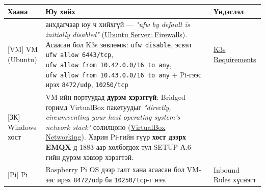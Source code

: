 \begingroup\scriptsize\begin{longtable}[]{@{}lll@{}}
\toprule
\begin{minipage}[b]{0.30\columnwidth}\raggedright
Хаана\strut
\end{minipage} & \begin{minipage}[b]{0.30\columnwidth}\raggedright
Юу хийх\strut
\end{minipage} & \begin{minipage}[b]{0.30\columnwidth}\raggedright
Үндэслэл\strut
\end{minipage}\tabularnewline
\midrule
\endhead
\begin{minipage}[t]{0.30\columnwidth}\raggedright
{[}VM{]} VM (Ubuntu)\strut
\end{minipage} & \begin{minipage}[t]{0.30\columnwidth}\raggedright
анхдагчаар юу ч хийхгүй --- \emph{"ufw by default is initially disabled"} (\href{https://ubuntu.com/server/docs/how-to/security/firewalls/}{Ubuntu Server: Firewalls}). Асаасан бол K3s зөвлөмж: \texttt{ufw\ disable}, эсвэл \texttt{ufw\ allow\ 6443/\allowbreak{}tcp}, \texttt{ufw\ allow\ from\ 10.\allowbreak{}42.\allowbreak{}0.\allowbreak{}0/\allowbreak{}16\ to\ any}, \texttt{ufw\ allow\ from\ 10.\allowbreak{}43.\allowbreak{}0.\allowbreak{}0/\allowbreak{}16\ to\ any} + Pi-гээс ирэх \texttt{8472/udp}, \texttt{10250/tcp}\strut
\end{minipage} & \begin{minipage}[t]{0.30\columnwidth}\raggedright
\href{https://docs.k3s.io/installation/requirements}{K3s Requirements}\strut
\end{minipage}\tabularnewline
\begin{minipage}[t]{0.30\columnwidth}\raggedright
{[}ЗК{]} Windows хост\strut
\end{minipage} & \begin{minipage}[t]{0.30\columnwidth}\raggedright
VM-ийн портуудад \textbf{дүрэм хэрэггүй}: Bridged горимд VirtualBox пакетуудыг \emph{"directly, circumventing your host operating system's network stack"} солилцоно (\href{https://www.virtualbox.org/manual/topics/networkingdetails.html}{VirtualBox Networking}). Харин Pi-гийн гүүр \textbf{хост дээрх EMQX}-д 1883-аар холбогдох тул SETUP А.6-гийн дүрэм хэвээр хэрэгтэй.\strut
\end{minipage} & \begin{minipage}[t]{0.30\columnwidth}\raggedright
\strut
\end{minipage}\tabularnewline
\begin{minipage}[t]{0.30\columnwidth}\raggedright
{[}Pi{]} Pi\strut
\end{minipage} & \begin{minipage}[t]{0.30\columnwidth}\raggedright
Raspberry Pi OS дээр галт хана асаасан бол VM-ээс ирэх \texttt{8472/udp} ба \texttt{10250/tcp}-г нээ.\strut
\end{minipage} & \begin{minipage}[t]{0.30\columnwidth}\raggedright
Inbound Rules хүснэгт\strut
\end{minipage}\tabularnewline
\bottomrule
\end{longtable}\endgroup

